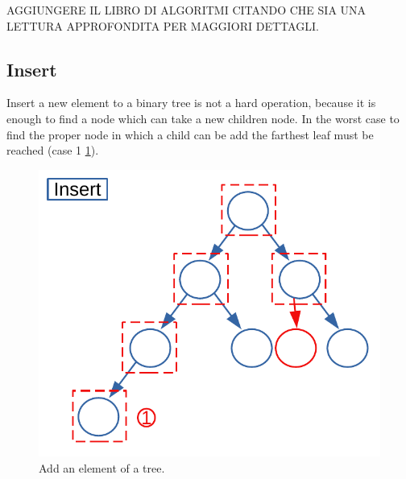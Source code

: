AGGIUNGERE IL LIBRO DI ALGORITMI CITANDO CHE SIA UNA LETTURA APPROFONDITA PER MAGGIORI DETTAGLI.
\subsection{Insert}
Insert a new element to a binary tree is not a hard operation, because it is enough to find a node which can take a new children node. In the worst case to find the proper node in which a child can be add the farthest leaf must be reached (case 1 \ref{trees_10}).

\begin{figure}[H]
	\begin{center}
		\includegraphics[scale=.6]{chapters/trees/images/trees_10.pdf}
		\caption[Add an element of a tree.]{Add an element of a tree.}
		\label{trees_10}
	\end{center}
\end{figure}

